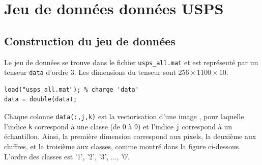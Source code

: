 \section{Jeu de données données USPS}


\subsection{Construction du jeu de données}
Le jeu de données se trouve dans le fichier \texttt{usps\_all.mat} et est représenté par un tenseur \texttt{data} d'ordre $3$. Les dimensions du tenseur sont $256\times 1100 \times 10$.

\begin{lstlisting}
load("usps_all.mat"); % charge 'data'
data = double(data);
\end{lstlisting}

Chaque colonne \texttt{data(:,j,k)} est la vectorisation d'une image , pour laquelle l'indice \texttt{k} correspond à une classe (de 0 à 9) et l'indice \texttt{j} correspond à un échantillon. Ainsi, la première dimension correspond aux pixels, la deuxième aux chiffres, et la troisième aux classes, comme montré dans la figure ci-dessous. L'ordre des classes est '1', '2', '3', $\ldots$, '0'.

\begin{center}
\end{center}


